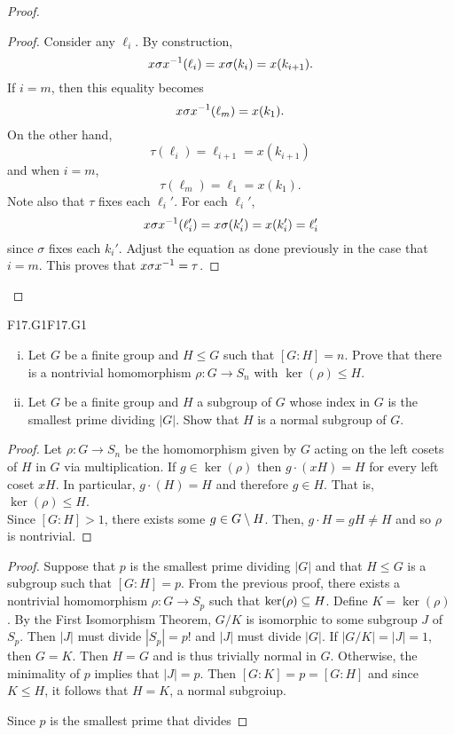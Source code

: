 \documentclass[../../AlgebraQualSolutions.tex]{subfiles}
\begin{document}
\begin{proof}
\begin{claim}
\begin{proof}
        Consider any $\ell_i$. By construction,
            \[x\sigma x^{-1}(\ell_i) = x\sigma(k_i) = x(k_{i+1}).\]
        If $i = m$, then this equality becomes
            \[x \sigma x^{-1}(\ell_m) = x(k_1).\]
        On the other hand,
            \[\tau(\ell_i) = \ell_{i+1} = x(k_{i+1})\]
        and when $i = m$,
            \[\tau(\ell_m) = \ell_1 = x(k_1).\]
        Note also that $\tau$ fixes each $\ell_i'$. For each $\ell_i'$,
            \[x\sigma x^{-1}(\ell_i') = x\sigma(k_i') = x(k_i') = \ell_i'\]
        since $\sigma$ fixes each $k_i'$. Adjust the equation as done previously in the case that $i = m$. This proves that $x\sigma x^{-1} = \tau$.
    \end{proof}
\end{claim}
\end{proof}


\begin{prob}{F17.G1}{F17.G1}
    \begin{enumerate}[(i)]
        \item Let $G$ be a finite group and $H \leq G$ such that $[G:H] = n$. Prove that there is a nontrivial homomorphism $\rho: G \to S_n$ with $\ker(\rho)\leq H$.
        \item Let $G$ be a finite group and $H$ a subgroup of $G$ whose index in $G$ is the smallest prime dividing $|G|$. Show that $H$ is a normal subgroup of $G$.
    \end{enumerate}
\end{prob}

\begin{proof}
    Let $\rho: G \to S_n$ be the homomorphism given by $G$ acting on the left cosets of $H$ in $G$ via multiplication. If $g \in \ker(\rho)$ then $g\cdot(xH) = H$ for every left coset $xH$. In particular, $g\cdot(H) = H$ and therefore $g \in H$. That is, $\ker(\rho) \leq H$.\\

    Since $[G:H] > 1$, there exists some $g \in G\setminus H$. Then, $g\cdot H = gH \neq H$ and so $\rho$ is nontrivial.
\end{proof}

\begin{proof}
    Suppose that $p$ is the smallest prime dividing $|G|$ and that $H \leq G$ is a subgroup such that $[G:H] = p$. From the previous proof, there exists a nontrivial homomorphism $\rho: G \to S_p$ such that $\ker(\rho) \subseteq H$. Define $K = \ker(\rho)$. By the First Isomorphism Theorem, $G/K$ is isomorphic to some subgroup $J$ of $S_p$. Then $|J|$ must divide $|S_p| = p!$ and $|J|$ must divide $|G|$. If $|G/K| = |J| = 1$, then $G = K$. Then $H = G$ and is thus trivially normal in $G$. Otherwise, the minimality of $p$ implies that $|J| = p$. Then $[G:K] = p = [G:H]$ and since $K \leq H$, it follows  that $H = K$, a normal subgroiup.
    
    Since $p$ is the smallest prime that divides 
\end{proof}
\end{document}
